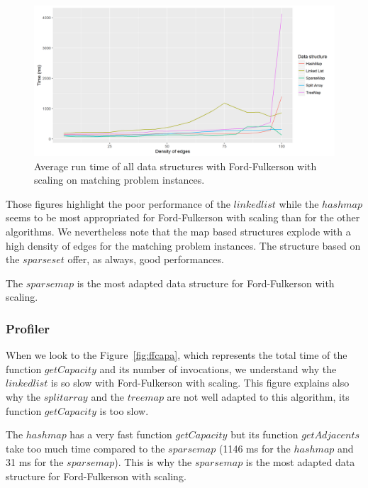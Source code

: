 \begin{figure}[H]
\begin{center}
\includegraphics[scale=0.55]{images/results/ffmeanmatching.png}
\caption{Average run time of all data structures with Ford-Fulkerson with scaling on matching problem instances.}
\label{fig:ffmeanmatching}
\end{center}
\end{figure}


Those figures highlight the poor performance of the $linked list$ while the $hash map$ seems to be most appropriated for Ford-Fulkerson with scaling than for the other algorithms. We nevertheless note that the map based structures explode with a high density of edges for the matching problem instances. The structure based on the $sparse set$ offer, as always, good performances. 

The $sparse map$ is the most adapted data structure for Ford-Fulkerson with scaling.

\subsubsection{Profiler}
When we look to the Figure~\ref{fig:ffcapa}, which represents the total time of the function $getCapacity$ and its number of invocations, we understand why the $linkedlist$ is so slow with Ford-Fulkerson with scaling. This figure explains also why the $split array$ and the $treemap$ are not well adapted to this algorithm, its function $getCapacity$ is too slow.

The $hashmap$ has a very fast function $getCapacity$ but its function $getAdjacents$ take too much time compared to the $sparsemap$ (1146 ms for the $hashmap$ and 31 ms for the $sparsemap$). This is why the $sparse map$ is the most adapted data structure for Ford-Fulkerson with scaling.

